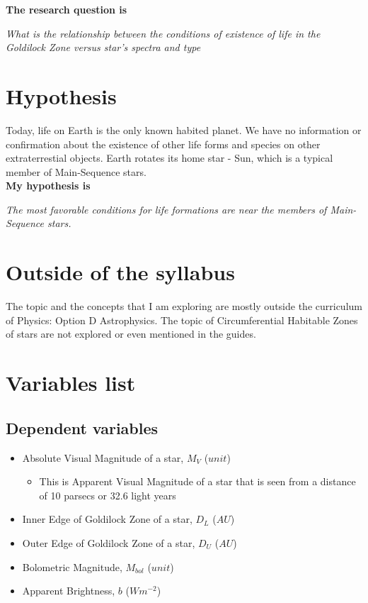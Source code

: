 \documentclass[a4paper,10pt]{article}
\begin{document}
\textbf{The research question is}

\textit{What is the relationship between the conditions of existence of life in the Goldilock Zone versus star's spectra and type }

\section{Hypothesis}

Today, life on Earth is the only known habited planet. We have no information or confirmation about the existence of other life forms and species on other extraterrestial objects. Earth rotates its home star - Sun, which is a typical member of Main-Sequence stars.\\

\textbf{My hypothesis is}

  \textit{The most favorable conditions for life formations are near the members of Main-Sequence stars.}

  \section{Outside of the syllabus}

  The topic and the concepts that I am exploring are mostly outside the curriculum of Physics: Option D Astrophysics. The topic of Circumferential Habitable Zones of stars are not explored or even mentioned in the guides.
  
  \onehalfspacing
  \section{Variables list}
  
  \subsection{Dependent variables}
  
  \begin{itemize}

  \item Absolute Visual Magnitude of a star, $M_V$ ($unit$)
    
    \begin{itemize}
      
    \item This is Apparent Visual Magnitude of a star that is seen from a distance of 10 parsecs or 32.6 light years
      
    \end{itemize}
    
  \item Inner Edge of Goldilock Zone of a star, $D_L$ ($AU$) 
    
  \item Outer Edge of Goldilock Zone of a star, $D_U$ ($AU$)
    
  \item Bolometric Magnitude, $M_{bol}$ ($unit$)
    
  \item Apparent Brightness, $b$ ($W m^{-2}$)
    
  \end{itemize}
  
\end{document}
